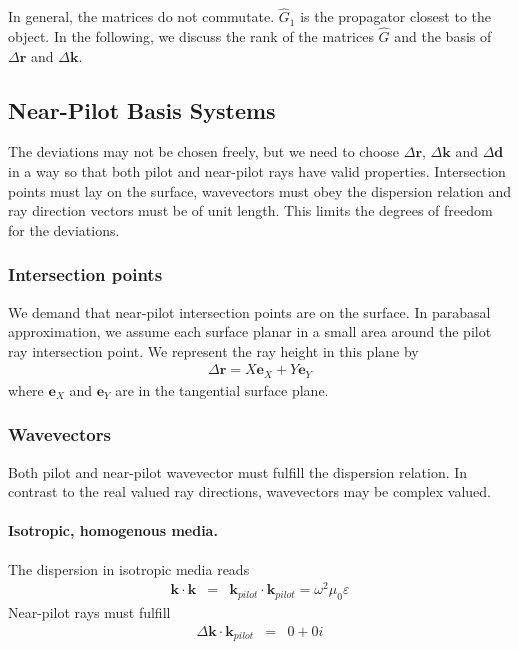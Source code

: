 \documentclass[12pt,a4paper,twoside,openright,BCOR10mm,headsepline,titlepage,abstracton,chapterprefix,final]{scrreprt}
\newcommand\Vector[1]{{\mathbf{#1}}}
\newcommand\vacuum{0}
\newcommand\wavenumber{k}
\newcommand\Wavevector{\Vector{\wavenumber}}
\newcommand\vacuumpermeability{\scalarpermeability_{\vacuum}}
\newcommand\scalarpermeability{\mu}
\newcommand\scalarpermittivity{\varepsilon}
\begin{document}
In general, the matrices do not commutate. $\hat{G}_1$ is the propagator closest to the object.
In the following, we discuss the rank of the matrices $\hat{G}$ and the basis of $\Delta \Vector{r}$ and $\Delta \Wavevector$.


\subsection{Near-Pilot Basis Systems}

The deviations may not be chosen freely, but we need to choose
$\Delta\Vector{r}$, $\Delta\Wavevector$ and $\Delta\Vector{d}$ 
in a way so that both pilot and near-pilot rays
have valid properties.
Intersection points must lay on the surface,
wavevectors must obey the dispersion relation 
and ray direction vectors must be of unit length.
This limits the degrees of freedom for the deviations.

\subsubsection{Intersection points}

We demand that near-pilot intersection points are on the surface.
In parabasal approximation, we assume each surface planar in a small area around the pilot ray intersection point. 
We represent the ray height in this plane by
\begin{eqnarray}
 \Delta\Vector{r} = X \Vector{e}_{X} + Y \Vector{e}_{Y}
 \label{eq:deltaR_equals_XY}
\end{eqnarray}
where $\Vector{e}_{X}$ and $\Vector{e}_{Y}$ are in the tangential surface plane.

\subsubsection{Wavevectors}
Both pilot and near-pilot wavevector must fulfill the dispersion relation. 
In contrast to the real valued ray directions, wavevectors may be complex valued.

\paragraph{Isotropic, homogenous media.}

The dispersion in isotropic media reads
\begin{eqnarray}
 \Wavevector \cdot \Wavevector &=& \Wavevector_{pilot} \cdot \Wavevector_{pilot} = \omega^2 \vacuumpermeability \scalarpermittivity
\end{eqnarray}
Near-pilot rays must fulfill
\begin{eqnarray}
 \Delta \Wavevector \cdot \Wavevector_{pilot} &=& 0 + 0i
\end{eqnarray}
\end{document}
